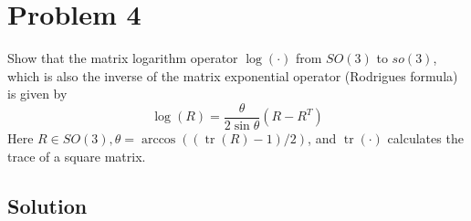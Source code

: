 \section*{Problem 4}

Show that the matrix logarithm operator \( \log (\cdot) \) from \( SO(3) \) to \(so(3)\), which is also the inverse of the matrix exponential operator (Rodrigues formula) is given by
\begin{equation*}
    \log (R) = \frac{\theta}{2 \sin \theta}\left(R-R^{T}\right)
\end{equation*}
Here \( R \in S O(3), \theta=\arccos ((\operatorname{tr}(R)-1) / 2) \), and \( \operatorname{tr}(\cdot) \) calculates the trace of a square matrix.

\subsection*{Solution}


